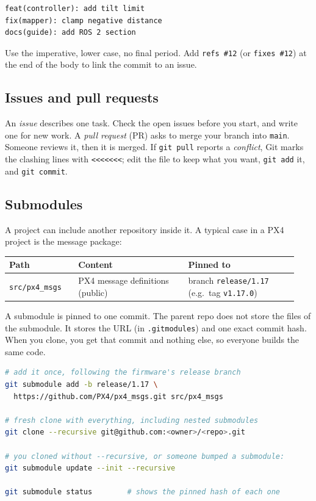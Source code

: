 \documentclass[11pt,a4paper]{article}
\begin{document}
\begin{lstlisting}
feat(controller): add tilt limit
fix(mapper): clamp negative distance
docs(guide): add ROS 2 section
\end{lstlisting}

Use the imperative, lower case, no final period. Add \texttt{refs \#12}
(or \texttt{fixes \#12}) at the end of the body to link the commit to
an issue.

\subsection{Issues and pull requests}\label{issues-and-pull-requests}

An \emph{issue} describes one task. Check the open issues before you
start, and write one for new work. A \emph{pull request} (PR) asks to
merge your branch into \texttt{main}. Someone reviews it, then it is
merged. If \texttt{git pull} reports a \emph{conflict}, Git marks the
clashing lines with
\texttt{\textless{}\textless{}\textless{}\textless{}\textless{}\textless{}\textless{}};
edit the file to keep what you want, \texttt{git add} it, and
\texttt{git commit}.

\subsection{Submodules}\label{submodules}

A project can include another repository inside it. A typical case in a
PX4 project is the message package:

\begin{longtable}{@{}p{0.225\linewidth} p{0.357\linewidth} p{0.357\linewidth}@{}}
	\toprule
	Path                   & Content                          & Pinned to \\
	\midrule
	\texttt{src/px4\_msgs} & PX4 message definitions (public) & branch
	\texttt{release/1.17} (e.g.~tag \texttt{v1.17.0})                     \\
	\bottomrule
\end{longtable}

A submodule is pinned to one commit. The parent repo
does not store the files of the submodule. It stores the URL (in
\texttt{.gitmodules}) and one exact commit hash. When you clone, you get
that commit and nothing else, so everyone builds the same code.

\begin{lstlisting}[language=bash]
# add it once, following the firmware's release branch
git submodule add -b release/1.17 \
  https://github.com/PX4/px4_msgs.git src/px4_msgs

# fresh clone with everything, including nested submodules
git clone --recursive git@github.com:<owner>/<repo>.git

# you cloned without --recursive, or someone bumped a submodule:
git submodule update --init --recursive

git submodule status        # shows the pinned hash of each one
\end{lstlisting}
\end{document}
